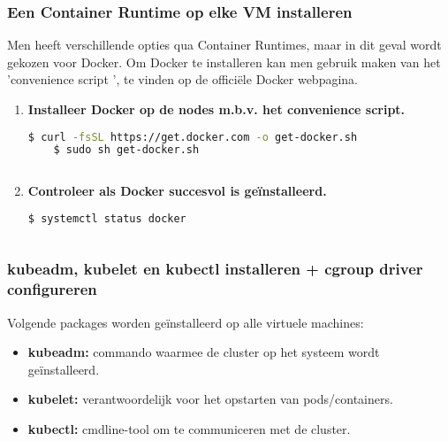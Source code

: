 \subsubsection{Een Container Runtime op elke VM installeren}

Men heeft verschillende opties qua Container Runtimes, maar in dit geval wordt gekozen voor Docker. Om Docker te installeren kan men gebruik maken van het 'convenience script ', te vinden op de officiële Docker webpagina. \autocite{Docker2021}
\begin{enumerate}
        \item {\bf Installeer Docker op de nodes m.b.v. het convenience script.}   
\begin{lstlisting}[language=bash]
    $ curl -fsSL https://get.docker.com -o get-docker.sh
    $ sudo sh get-docker.sh    
    
\end{lstlisting}
    
    \item {\bf Controleer als Docker succesvol is geïnstalleerd.}
\begin{lstlisting}[language=bash]  
    $ systemctl status docker
    
\end{lstlisting}
\end{enumerate}

\subsubsection{kubeadm, kubelet en kubectl installeren + cgroup driver configureren}

Volgende packages worden geïnstalleerd op alle virtuele machines:
\begin{itemize}
    \item {\bf kubeadm:} commando waarmee de cluster op het systeem wordt geïnstalleerd.
    \item {\bf kubelet:} verantwoordelijk voor het opstarten van pods/containers.
    \item {\bf kubectl:} cmdline-tool om te communiceren met de cluster.
\end{itemize}

